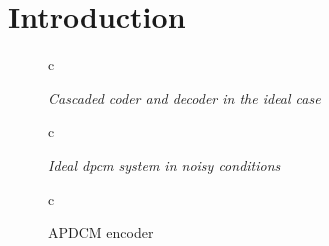 \chapter{Introduction} %
\label{cha:introduction}
\begin{figure}[htbp]
  \centering
  \begin{tabular}[h]{c}
  \end{tabular}
  \caption{\it Cascaded coder and decoder in the ideal case }
  \label{fig:linear-prediction}
\end{figure}

\begin{figure}[htbp]
  \centering
   \begin{tabular}[h]{c}
  \end{tabular}
  \caption{\it Ideal dpcm system in noisy conditions}
  \label{fig:linear-prediction-reconstruction-noisy}
\end{figure}

\begin{figure}[htbp]
  \centering
   \begin{tabular}[h]{c}
  \end{tabular}
  \caption{APDCM encoder}
  \label{fig:ADPCM}
\end{figure}

